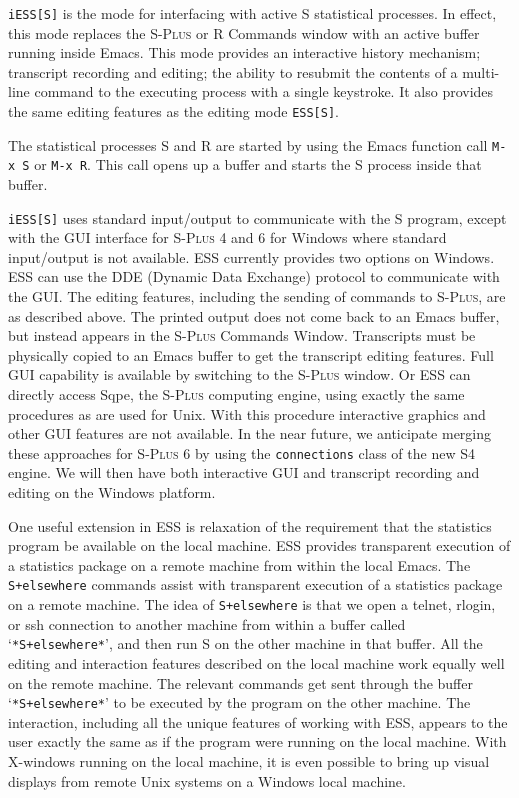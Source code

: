 \documentclass{article}
\newcommand*{\Splus}{\textsc{S-Plus}}
\newcommand{\stexttt}[1]{{\small\texttt{#1}}}
\newcommand{\file}[1]{`\stexttt{#1}'}
\begin{document}
\stexttt{iESS[S]} is the mode for interfacing with active S statistical
processes.  In effect, this mode replaces the \Splus{} or R Commands
window with an active buffer running inside Emacs.  This mode provides
an interactive history mechanism; transcript recording and editing; the
ability to resubmit the contents of a multi-line command to the
executing process with a single keystroke.  It also provides the same
editing features as the editing mode \stexttt{ESS[S]}.

The statistical processes S and R are started by using the Emacs
function call \stexttt{M-x~S} or \stexttt{M-x~R}.  This call opens up a
buffer and starts the S process inside that buffer.

\stexttt{iESS[S]} uses standard input/output to communicate with the S
program, except with the GUI interface for \Splus{} 4 and 6 for Windows
where standard input/output is not available.  ESS currently provides
two options on Windows.  ESS can use the DDE (Dynamic Data Exchange)
protocol to communicate with the GUI.  The editing features, including
the sending of commands to \Splus, are as described above.  The printed
output does not come back to an Emacs buffer, but instead appears in the
\Splus{} Commands Window.  Transcripts must be physically copied to an
Emacs buffer to get the transcript editing features.  Full GUI
capability is available by switching to the \Splus{} window.  Or ESS can
directly access Sqpe, the \Splus{} computing engine, using exactly the
same procedures as are used for Unix.  With this procedure interactive
graphics and other GUI features are not available.  In the near future,
we anticipate merging these approaches for \Splus{} 6 by using the
\stexttt{connections} class of the new S4 engine.  We will then have
both interactive GUI and transcript recording and editing on the Windows
platform.

One useful extension in ESS is relaxation of the requirement that the
statistics program be available on the local machine.  ESS provides
transparent execution of a statistics package on a remote machine from
within the local Emacs.  The \stexttt{S+elsewhere} commands assist
with transparent execution of a statistics package on a remote
machine.  The idea of \stexttt{S+elsewhere} is that we open a telnet,
rlogin, or ssh connection to another machine from within a buffer
called \file{*S+elsewhere*}, and then run S on the other machine in
that buffer.  All the editing and interaction features described on
the local machine work equally well on the remote machine.  The
relevant commands get sent through the buffer \file{*S+elsewhere*} to
be executed by the program on the other machine.  The interaction,
including all the unique features of working with ESS, appears to the
user exactly the same as if the program were running on the local
machine.  With X-windows running on the local machine, it is even
possible to bring up visual displays from remote Unix systems on a
Windows local machine.
\end{document}
